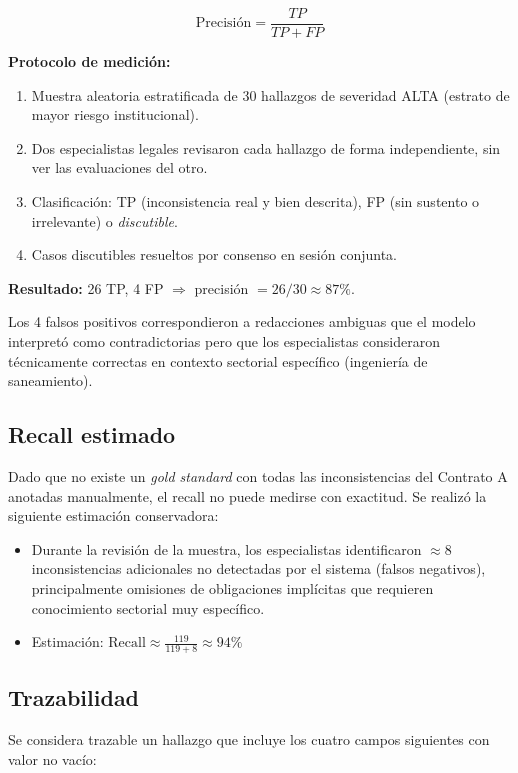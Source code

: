 \[
\text{Precisión} = \frac{TP}{TP + FP}
\]

\textbf{Protocolo de medición:}
\begin{enumerate}
    \item Muestra aleatoria estratificada de 30 hallazgos de severidad ALTA
    (estrato de mayor riesgo institucional).
    \item Dos especialistas legales revisaron cada hallazgo de forma
    independiente, sin ver las evaluaciones del otro.
    \item Clasificación: TP (inconsistencia real y bien descrita), FP
    (sin sustento o irrelevante) o \textit{discutible}.
    \item Casos discutibles resueltos por consenso en sesión conjunta.
\end{enumerate}

\textbf{Resultado:} 26 TP, 4 FP $\Rightarrow$ precisión $= 26/30 \approx 87\%$.

Los 4 falsos positivos correspondieron a redacciones ambiguas que el modelo
interpretó como contradictorias pero que los especialistas consideraron
técnicamente correctas en contexto sectorial específico (ingeniería
de saneamiento).

\subsection{Recall estimado}

Dado que no existe un \textit{gold standard} con todas las inconsistencias
del Contrato A anotadas manualmente, el recall no puede medirse
con exactitud. Se realizó la siguiente estimación conservadora:

\begin{itemize}
    \item Durante la revisión de la muestra, los especialistas identificaron
    $\approx 8$ inconsistencias adicionales no detectadas por el sistema
    (falsos negativos), principalmente omisiones de obligaciones implícitas
    que requieren conocimiento sectorial muy específico.
    \item Estimación:
    $\displaystyle\text{Recall} \approx \frac{119}{119 + 8} \approx 94\%$
\end{itemize}

\subsection{Trazabilidad}

Se considera trazable un hallazgo que incluye los cuatro campos siguientes
con valor no vacío:

